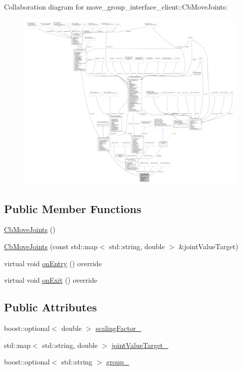 Collaboration diagram for move\+\_\+group\+\_\+interface\+\_\+client\+:\+:Cb\+Move\+Joints\+:
\nopagebreak
\begin{figure}[H]
\begin{center}
\leavevmode
\includegraphics[width=350pt]{classmove__group__interface__client_1_1CbMoveJoints__coll__graph}
\end{center}
\end{figure}
\subsection*{Public Member Functions}
\begin{DoxyCompactItemize}
\item 
\hyperlink{classmove__group__interface__client_1_1CbMoveJoints_a946c2fd5f9b5415fa9b6a5976fe1b750}{Cb\+Move\+Joints} ()
\item 
\hyperlink{classmove__group__interface__client_1_1CbMoveJoints_a0481527a72230d2399f08cf2f61d9c34}{Cb\+Move\+Joints} (const std\+::map$<$ std\+::string, double $>$ \&joint\+Value\+Target)
\item 
virtual void \hyperlink{classmove__group__interface__client_1_1CbMoveJoints_af1e51367bb28be09704ab3747afff1f1}{on\+Entry} () override
\item 
virtual void \hyperlink{classmove__group__interface__client_1_1CbMoveJoints_ac797c81d4a17c11e224553d9c231fe9f}{on\+Exit} () override
\end{DoxyCompactItemize}
\subsection*{Public Attributes}
\begin{DoxyCompactItemize}
\item 
boost\+::optional$<$ double $>$ \hyperlink{classmove__group__interface__client_1_1CbMoveJoints_a05f9ed8765ddb6e02b108a790bdf8f88}{scaling\+Factor\+\_\+}
\item 
std\+::map$<$ std\+::string, double $>$ \hyperlink{classmove__group__interface__client_1_1CbMoveJoints_a7339a7f34ba2c481b6a0821db5f1a483}{joint\+Value\+Target\+\_\+}
\item 
boost\+::optional$<$ std\+::string $>$ \hyperlink{classmove__group__interface__client_1_1CbMoveJoints_aed3fff5331aa947ec89c55945bae1afc}{group\+\_\+}
\end{DoxyCompactItemize}

